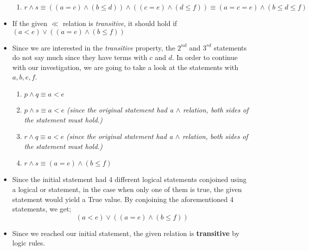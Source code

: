 \documentclass[12pt]{article}
\begin{document}
\begin{itemize}
\begin{enumerate}
        \item $r \land s \equiv ((a = c) \land (b \leq d)) \land ((c = e) \land (d \leq f)) \equiv (a = c = e) \land (b \leq d \leq f) $
    \end{enumerate}
    \item If the given $\ll$ relation is \textit{transitive}, it should hold if $(a < e) \lor ((a = e) \land (b \leq f))$
    \item Since we are interested in the \textit{transitive} property, the $2^{nd}$ and $3^{rd}$ statements do not say much since they have terms with $c$ and $d$. In order to continue with our investigation, we are going to take a look at the statements with $a,b,e,f$. 
    \begin{enumerate}
        \item $p \land q \equiv a < e$
        \item $p \land s  \equiv a < e$ \textit{(since the original statement had a $\land$ relation, both sides of the statement must hold.)}
        \item $r \land q \equiv a < e$ \textit{(since the original statement had a $\land$ relation, both sides of the statement must hold.)}
        \item $r \land s \equiv (a = e) \land (b \leq f) $
    \end{enumerate}
    \item Since the initial statement had 4 different logical statements conjoined using a logical or statement, in the case when only one of them is true, the given statement would yield a True value. By conjoining the aforementioned 4 statements, we get;
    $$(a < e) \lor ((a = e) \land (b \leq f))$$
    \item Since we reached our initial statement, the given relation is \textbf{transitive} by logic rules.
\end{itemize}
\end{document}
